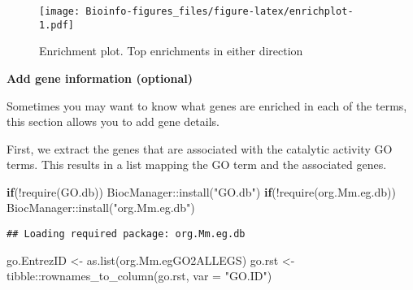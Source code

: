 \documentclass[
  openany]{book}
\newenvironment{Shaded}{\begin{snugshade}}{\end{snugshade}}
\newcommand{\AttributeTok}[1]{\textcolor[rgb]{0.77,0.63,0.00}{#1}}
\newcommand{\ControlFlowTok}[1]{\textcolor[rgb]{0.13,0.29,0.53}{\textbf{#1}}}
\newcommand{\FunctionTok}[1]{\textcolor[rgb]{0.00,0.00,0.00}{#1}}
\newcommand{\NormalTok}[1]{#1}
\newcommand{\OtherTok}[1]{\textcolor[rgb]{0.56,0.35,0.01}{#1}}
\newcommand{\SpecialCharTok}[1]{\textcolor[rgb]{0.00,0.00,0.00}{#1}}
\newcommand{\StringTok}[1]{\textcolor[rgb]{0.31,0.60,0.02}{#1}}
\begin{document}
\begin{figure}
\centering
\texttt{[image: Bioinfo-figures\_files/figure-latex/enrichplot-1.pdf]}
\caption{\label{fig:enrichplot}Enrichment plot. Top enrichments in either direction}
\end{figure}

\textbf{Add gene information (optional)}

Sometimes you may want to know what genes are enriched in each of the terms, this section allows you to add gene details.

First, we extract the genes that are associated with the catalytic activity GO terms. This results in a list mapping the GO term and the associated genes.

\begin{Shaded}
\begin{Highlighting}[]
\ControlFlowTok{if}\NormalTok{(}\SpecialCharTok{!}\FunctionTok{require}\NormalTok{(GO.db))}
\NormalTok{  BiocManager}\SpecialCharTok{::}\FunctionTok{install}\NormalTok{(}\StringTok{"GO.db"}\NormalTok{)}
\ControlFlowTok{if}\NormalTok{(}\SpecialCharTok{!}\FunctionTok{require}\NormalTok{(org.Mm.eg.db))}
\NormalTok{  BiocManager}\SpecialCharTok{::}\FunctionTok{install}\NormalTok{(}\StringTok{"org.Mm.eg.db"}\NormalTok{)}
\end{Highlighting}
\end{Shaded}

\begin{verbatim}
## Loading required package: org.Mm.eg.db
\end{verbatim}

\begin{Shaded}
\begin{Highlighting}[]
\NormalTok{go.EntrezID }\OtherTok{\textless{}{-}} \FunctionTok{as.list}\NormalTok{(org.Mm.egGO2ALLEGS)}
\NormalTok{go.rst }\OtherTok{\textless{}{-}}\NormalTok{ tibble}\SpecialCharTok{::}\FunctionTok{rownames\_to\_column}\NormalTok{(go.rst, }\AttributeTok{var =} \StringTok{"GO.ID"}\NormalTok{)}
\end{Highlighting}
\end{Shaded}
\end{document}
